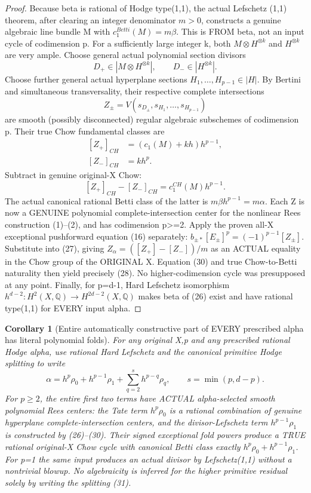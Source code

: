\documentclass[11pt]{article}
\newtheorem{corollary}[theorem]{Corollary}
\begin{document}
\begin{proof}
Because beta is rational of Hodge type(1,1),
the actual Lefschetz (1,1) theorem,
after clearing an integer denominator $m>0$,
constructs a genuine algebraic line bundle
M with $c_1^{Betti}(M)=m\beta$.
This is FROM beta, not an input cycle
of codimension p.
For a sufficiently large integer k,
both $M\otimes H^{\otimes k}$ and
$H^{\otimes k}$ are very ample.
Choose general actual polynomial
section divisors
\[
 D_+\in|M\otimes H^{\otimes k}|,
 \qquad D_-\in|H^{\otimes k}|.
\]
Choose further general actual
hyperplane sections
$H_1,\ldots,H_{p-1}\in|H|$.
By Bertini and simultaneous transversality,
their respective complete intersections
\[
 \boxed{
 Z_\pm=V(s_{D_\pm},
          s_{H_1},\ldots,s_{H_{p-1}})
 }                                                       \tag{29}
\]
are smooth (possibly disconnected)
regular algebraic subschemes of
codimension p. Their true Chow
fundamental classes are
\[
 \begin{aligned}
 [Z_+]_{CH}
   &=(c_1(M)+kh)h^{p-1},\\
 [Z_-]_{CH}
   &=k h^p.
 \end{aligned}
\]
Subtract in genuine original-X Chow:
\[
 [Z_+]_{CH}-[Z_-]_{CH}
      =c_1^{CH}(M)h^{p-1}.
                                                               \tag{30}
\]
The actual canonical rational Betti
class of the latter is
$m\beta h^{p-1}=m\alpha$.
Each Z is now a GENUINE polynomial
complete-intersection center for the
nonlinear Rees construction (1)--(2),
and has codimension p>=2.
Apply the proven all-X exceptional
pushforward equation (16) separately:
$b_{\pm*}[E_\pm]^p=(-1)^{p-1}[Z_\pm]$.
Substitute into (27), giving
$Z_\alpha=([Z_+]-[Z_-])/m$ as an
ACTUAL equality in the Chow group
of the ORIGINAL X. Equation (30)
and true Chow-to-Betti naturality
then yield precisely (28).
No higher-codimension cycle was
presupposed at any point.
Finally, for p=d-1, Hard Lefschetz
isomorphism $h^{d-2}:H^2(X,\mathbb Q)
\to H^{2d-2}(X,\mathbb Q)$
makes beta of (26) exist
and have rational type(1,1)
for EVERY input alpha.
\end{proof}

\begin{corollary}[Entire automatically constructive part of EVERY prescribed alpha has literal polynomial folds]
For any original X,p and any prescribed
rational Hodge alpha, use rational
Hard Lefschetz and the canonical
primitive Hodge splitting to write
\[
 \alpha=
   h^p\rho_0+h^{p-1}\rho_1+
   \sum_{q=2}^{s}h^{p-q}\rho_q,
 \qquad s=\min(p,d-p).
                                                               \tag{31}
\]
For $p\ge2$, the entire first two
terms have ACTUAL alpha-selected
smooth polynomial Rees centers:
the Tate term $h^p\rho_0$ is a
rational combination of genuine
hyperplane complete-intersection
centers, and the divisor-Lefschetz
term $h^{p-1}\rho_1$ is constructed
by (26)--(30). Their signed exceptional
fold powers produce a TRUE rational
original-X Chow cycle with canonical
Betti class exactly
$h^p\rho_0+h^{p-1}\rho_1$.
For p=1 the same input produces an
actual divisor by Lefschetz(1,1)
without a nontrivial blowup.
No algebraicity is inferred for the
higher primitive residual solely by
writing the splitting (31).
\end{corollary}
\end{document}
